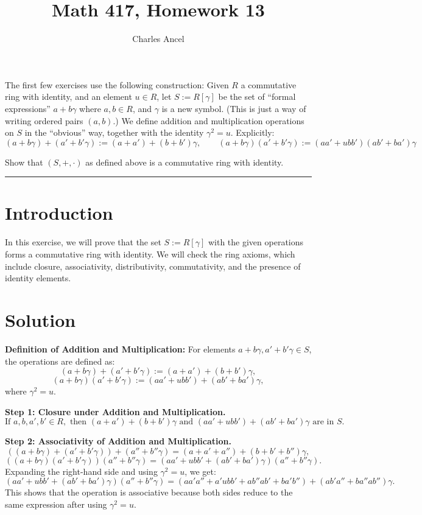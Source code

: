 \documentclass[12pt]{amsart}
\title{Math 417, Homework 13}
\author{Charles Ancel}
\theoremstyle{definition}
\numberwithin{equation}{section}
\begin{document}
\maketitle

The first few exercises use the following construction: Given \(R\) a commutative ring with identity, and an element \(u \in R\), let \(S := R[\gamma]\) be the set of ``formal expressions'' \(a + b\gamma \) where \(a,b \in R\), and \(\gamma \) is a new symbol. 
(This is just a way of writing ordered pairs \((a,b)\).) We define addition and multiplication operations on \(S \) in the ``obvious'' way, together with the identity \(\gamma^2=u\). 
Explicitly: \[(a+b\gamma )+(a'+b'\gamma ):= (a+a')+(b+b')\gamma, \qquad (a+b\gamma)(a'+b'\gamma):=(aa'+ubb')(ab'+ba')\gamma \]

\begin{exercise}{1} Show that \((S,+,\cdot) \) as defined above is a commutative ring with identity.

    \noindent\rule{\linewidth}{1pt}

    \section*{Introduction}
    In this exercise, we will prove that the set \(S := R[\gamma]\) with the given operations forms a commutative ring with identity. We will check the ring axioms, which include closure, associativity, distributivity, commutativity, and the presence of identity elements.

    \section*{Solution}
    \noindent \textbf{Definition of Addition and Multiplication:}
    For elements \(a + b\gamma, a' + b'\gamma \in S\), the operations are defined as:
    \[
    (a + b\gamma) + (a' + b'\gamma) := (a + a') + (b + b')\gamma,
    \]
    \[
    (a + b\gamma)(a' + b'\gamma) := (aa' + ubb') + (ab' + ba')\gamma,
    \]
    where \(\gamma^2 = u\).

    \noindent \textbf{Step 1: Closure under Addition and Multiplication.}
    \[
    \text{If } a, b, a', b' \in R, \text{ then } (a + a') + (b + b')\gamma \text{ and } (aa' + ubb') + (ab' + ba')\gamma \text{ are in } S.
    \]

    \noindent \textbf{Step 2: Associativity of Addition and Multiplication.}
    \[
    ((a + b\gamma) + (a' + b'\gamma)) + (a'' + b''\gamma) = (a + a' + a'') + (b + b' + b'')\gamma,
    \]
    \[
    ((a + b\gamma)(a' + b'\gamma))(a'' + b''\gamma) = (aa' + ubb' + (ab' + ba')\gamma)(a'' + b''\gamma).
    \]
    Expanding the right-hand side and using \(\gamma^2 = u\), we get:
    \[
    (aa' + ubb' + (ab' + ba')\gamma)(a'' + b''\gamma) = (aa'a'' + a'ubb' + ab''ab' + ba'b'') + (ab'a'' + ba''ab'')\gamma.
    \]
    This shows that the operation is associative because both sides reduce to the same expression after using \(\gamma^2 = u\).


\end{exercise}
\end{document}
